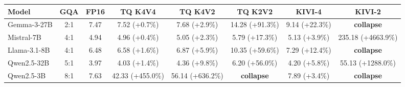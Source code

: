 \begin{tabular}{l c c c c c c c}
\toprule
Model & GQA & FP16 & TQ K4V4 & TQ K4V2 & TQ K2V2 & KIVI-4 & KIVI-2 \\
\midrule
Gemma-3-27B & 2:1 & 7.47 & 7.52 {\small(+0.7\%)} & 7.68 {\small(+2.9\%)} & 14.28 {\small(+91.3\%)} & 9.14 {\small(+22.3\%)} & \textbf{collapse} \\
Mistral-7B & 4:1 & 4.94 & 4.96 {\small(+0.4\%)} & 5.05 {\small(+2.3\%)} & 5.79 {\small(+17.3\%)} & 5.13 {\small(+3.9\%)} & 235.18 {\small(+4663.9\%)} \\
Llama-3.1-8B & 4:1 & 6.48 & 6.58 {\small(+1.6\%)} & 6.87 {\small(+5.9\%)} & 10.35 {\small(+59.6\%)} & 7.29 {\small(+12.4\%)} & \textbf{collapse} \\
Qwen2.5-32B & 5:1 & 3.97 & 4.03 {\small(+1.4\%)} & 4.36 {\small(+9.8\%)} & 6.20 {\small(+56.0\%)} & 4.20 {\small(+5.8\%)} & 55.13 {\small(+1288.0\%)} \\
Qwen2.5-3B & 8:1 & 7.63 & 42.33 {\small(+455.0\%)} & 56.14 {\small(+636.2\%)} & \textbf{collapse} & 7.89 {\small(+3.4\%)} & \textbf{collapse} \\
\bottomrule
\end{tabular}